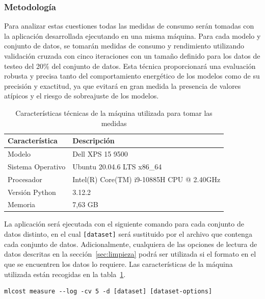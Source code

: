 \subsubsection{Metodología}

Para analizar estas cuestiones todas las medidas de consumo serán tomadas con la aplicación desarrollada ejecutando en una misma máquina. Para cada modelo y conjunto de datos, se tomarán medidas de consumo y rendimiento utilizando validación cruzada con cinco iteraciones con un tamaño definido para los datos de testeo del 20\% del conjunto de datos. Esta técnica proporcionará una evaluación robusta y precisa tanto del comportamiento energético de los modelos como de su precisión y exactitud, ya que evitará en gran medida la presencia de valores atípicos y el riesgo de sobreajuste de los modelos.

\begin{table}[h]
    \caption{Características técnicas de la máquina utilizada para tomar las medidas}
    \label{tab:caracteristicas-tecnicas}
    \renewcommand\arraystretch{1.4}
    \centering
    \begin{tabular}{m{} m{}}
        \toprule
         \textbf{Característica} & \textbf{Descripción} \\
         \midrule
         Modelo & Dell XPS 15 9500\\
         Sistema Operativo & Ubuntu 20.04.6 LTS x86\_64\\
         Procesador & Intel(R) Core(TM) i9-10885H CPU @ 2.40GHz\\
         Versión Python & 3.12.2\\
         Memoria & 7,63 GB\\
         \bottomrule
    \end{tabular}
\end{table}

La aplicación será ejecutada con el siguiente comando para cada conjunto de datos distinto, en el cual \texttt{[dataset]} será sustituido por el archivo que contenga cada conjunto de datos. Adicionalmente, cualquiera de las opciones de lectura de datos descritas en la sección~\ref{sec:limpieza} podrá ser utilizada si el formato en el que se encuentren los datos lo requiere. Las características de la máquina utilizada están recogidas en la tabla~\ref{tab:caracteristicas-tecnicas}.
\begin{verbatim}
mlcost measure --log -cv 5 -d [dataset] [dataset-options]
\end{verbatim}


